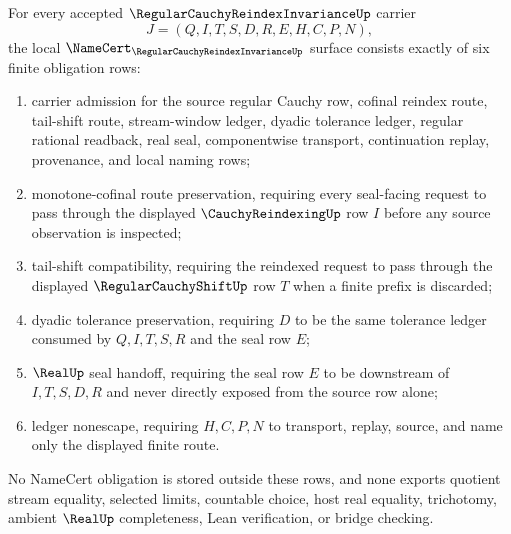\begin{theorem}
\label{thm:regular-cauchy-reindex-invariance-namecert-obligations}
For every accepted $\RegularCauchyReindexInvarianceUp$ carrier
$$
J=(Q,I,T,S,D,R,E,H,C,P,N),
$$
the local $\NameCert_{\RegularCauchyReindexInvarianceUp}$ surface consists exactly of six finite obligation rows:
\begin{enumerate}
\item carrier admission for the source regular Cauchy row, cofinal reindex route, tail-shift route, stream-window ledger, dyadic tolerance ledger, regular rational readback, real seal, componentwise transport, continuation replay, provenance, and local naming rows;
\item monotone-cofinal route preservation, requiring every seal-facing request to pass through the displayed $\CauchyReindexingUp$ row $I$ before any source observation is inspected;
\item tail-shift compatibility, requiring the reindexed request to pass through the displayed $\RegularCauchyShiftUp$ row $T$ when a finite prefix is discarded;
\item dyadic tolerance preservation, requiring $D$ to be the same tolerance ledger consumed by $Q,I,T,S,R$ and the seal row $E$;
\item $\RealUp$ seal handoff, requiring the seal row $E$ to be downstream of $I,T,S,D,R$ and never directly exposed from the source row alone;
\item ledger nonescape, requiring $H,C,P,N$ to transport, replay, source, and name only the displayed finite route.
\end{enumerate}
No NameCert obligation is stored outside these rows, and none exports quotient stream equality, selected limits, countable choice, host real equality, trichotomy, ambient $\RealUp$ completeness, Lean verification, or bridge checking.
\end{theorem}
